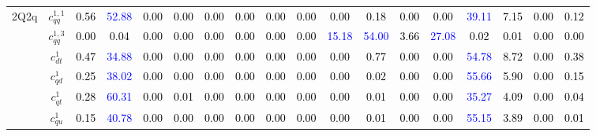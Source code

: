 \documentclass{article}
\begin{document}
\begin{landscape}
\begin{table}[H]
\begin{tabular}{|c|c|c|c|c|c|c|c|c|c|c|c|c|c|c|c|c|c|}
\multirow{14}{*}{2Q2q}
 & $c_{qq}^{1,1}$ & \textcolor{black}{0.56} & \textcolor{blue}{52.88} & \textcolor{black}{0.00} & \textcolor{black}{0.00} & \textcolor{black}{0.00} & \textcolor{black}{0.00} & \textcolor{black}{0.00} & \textcolor{black}{0.00} & \textcolor{black}{0.00} & \textcolor{black}{0.18} & \textcolor{black}{0.00} & \textcolor{black}{0.00} & \textcolor{blue}{39.11} & \textcolor{black}{7.15} & \textcolor{black}{0.00} & \textcolor{black}{0.12}\\ \cline{2-18}
 & $c_{qq}^{1,3}$ & \textcolor{black}{0.00} & \textcolor{black}{0.04} & \textcolor{black}{0.00} & \textcolor{black}{0.00} & \textcolor{black}{0.00} & \textcolor{black}{0.00} & \textcolor{black}{0.00} & \textcolor{black}{0.00} & \textcolor{blue}{15.18} & \textcolor{blue}{54.00} & \textcolor{black}{3.66} & \textcolor{blue}{27.08} & \textcolor{black}{0.02} & \textcolor{black}{0.01} & \textcolor{black}{0.00} & \textcolor{black}{0.00}\\ \cline{2-18}
 & $c_{dt}^{1}$ & \textcolor{black}{0.47} & \textcolor{blue}{34.88} & \textcolor{black}{0.00} & \textcolor{black}{0.00} & \textcolor{black}{0.00} & \textcolor{black}{0.00} & \textcolor{black}{0.00} & \textcolor{black}{0.00} & \textcolor{black}{0.00} & \textcolor{black}{0.77} & \textcolor{black}{0.00} & \textcolor{black}{0.00} & \textcolor{blue}{54.78} & \textcolor{black}{8.72} & \textcolor{black}{0.00} & \textcolor{black}{0.38}\\ \cline{2-18}
 & $c_{qd}^{1}$ & \textcolor{black}{0.25} & \textcolor{blue}{38.02} & \textcolor{black}{0.00} & \textcolor{black}{0.00} & \textcolor{black}{0.00} & \textcolor{black}{0.00} & \textcolor{black}{0.00} & \textcolor{black}{0.00} & \textcolor{black}{0.00} & \textcolor{black}{0.02} & \textcolor{black}{0.00} & \textcolor{black}{0.00} & \textcolor{blue}{55.66} & \textcolor{black}{5.90} & \textcolor{black}{0.00} & \textcolor{black}{0.15}\\ \cline{2-18}
 & $c_{qt}^{1}$ & \textcolor{black}{0.28} & \textcolor{blue}{60.31} & \textcolor{black}{0.00} & \textcolor{black}{0.01} & \textcolor{black}{0.00} & \textcolor{black}{0.00} & \textcolor{black}{0.00} & \textcolor{black}{0.00} & \textcolor{black}{0.00} & \textcolor{black}{0.01} & \textcolor{black}{0.00} & \textcolor{black}{0.00} & \textcolor{blue}{35.27} & \textcolor{black}{4.09} & \textcolor{black}{0.00} & \textcolor{black}{0.04}\\ \cline{2-18}
 & $c_{qu}^{1}$ & \textcolor{black}{0.15} & \textcolor{blue}{40.78} & \textcolor{black}{0.00} & \textcolor{black}{0.00} & \textcolor{black}{0.00} & \textcolor{black}{0.00} & \textcolor{black}{0.00} & \textcolor{black}{0.00} & \textcolor{black}{0.00} & \textcolor{black}{0.01} & \textcolor{black}{0.00} & \textcolor{black}{0.00} & \textcolor{blue}{55.15} & \textcolor{black}{3.89} & \textcolor{black}{0.00} & \textcolor{black}{0.01}\\ \cline{2-18}

\end{tabular}
\end{table}
\end{landscape}
\end{document}
